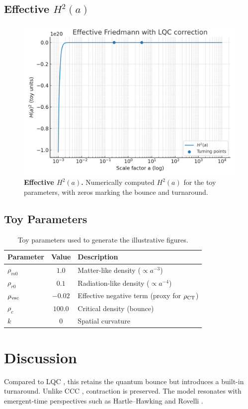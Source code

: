 \documentclass[12pt]{article}
\begin{document}
\subsection{Effective $H^2(a)$}
\begin{figure}[H]
\centering
\includegraphics[width=0.78\linewidth]{figures/plot_H2_from_params.png}
\caption{\textbf{Effective $H^2(a)$.}
Numerically computed $H^2(a)$ for the toy parameters, with zeros marking the bounce
and turnaround.}
\end{figure}

\subsection*{Toy Parameters}
\begin{table}[H]
\centering
\small
\setlength{\tabcolsep}{6pt}
\renewcommand{\arraystretch}{1.2}
\begin{tabular}{lcl}
\toprule
Parameter & Value & Description \\
\midrule
$\rho_{m0}$ & $1.0$ & Matter-like density ($\propto a^{-3}$) \\
$\rho_{r0}$ & $0.1$ & Radiation-like density ($\propto a^{-4}$) \\
$\rho_{\rm vac}$ & $-0.02$ & Effective negative term (proxy for $\rho_{\rm CT}$) \\
$\rho_{c}$ & $100.0$ & Critical density (bounce) \\
$k$ & $0$ & Spatial curvature \\
\bottomrule
\end{tabular}
\caption{Toy parameters used to generate the illustrative figures.}
\end{table}

\section{Discussion}
Compared to LQC \cite{Ashtekar2006}, this retains the quantum bounce but introduces a
built-in turnaround. Unlike CCC \cite{Penrose2010}, contraction is preserved.
The model resonates with emergent-time perspectives such as Hartle--Hawking \cite{Hartle1983}
and Rovelli \cite{Rovelli2017}.
\end{document}
